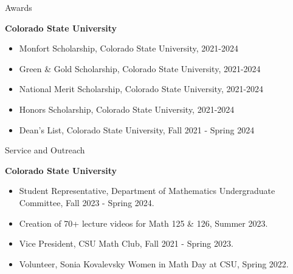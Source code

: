 \documentclass[
	11pt, %
]{resume} %
\begin{document}

\begin{rSection}{Awards} %


	\textbf{Colorado State University}
	\begin{itemize}
		\item{Monfort Scholarship, Colorado State University, 2021-2024}
		\item{Green \& Gold Scholarship, Colorado State University, 2021-2024}
		\item{National Merit Scholarship, Colorado State University, 2021-2024}
		\item{Honors Scholarship, Colorado State University, 2021-2024}
		\item{Dean's List, Colorado State University, Fall 2021 - Spring 2024}
	\end{itemize}
	
\end{rSection}


\begin{rSection}{Service and Outreach}

	\textbf{Colorado State University}
	\begin{itemize}
		\item{Student Representative, Department of Mathematics Undergraduate Committee, Fall 2023 - Spring 2024.}
		\item{Creation of 70+ lecture videos for Math 125 \& 126, Summer 2023.}
		\item{Vice President, CSU Math Club, Fall 2021 - Spring 2023.}
		\item{Volunteer, Sonia Kovalevsky Women in Math Day at CSU, Spring 2022.}
	\end{itemize}
	
\end{rSection}
\end{document}
